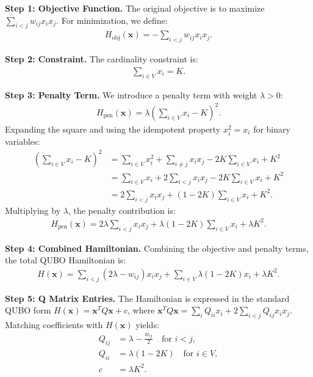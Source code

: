 \documentclass[12pt]{article}
\begin{document}
\textbf{Step 1: Objective Function.}
The original objective is to maximize $\sum_{i < j} w_{ij} x_i x_j$. For minimization, we define:
\begin{align}
    H_{\text{obj}}(\mathbf{x}) = -\sum_{i < j} w_{ij} x_i x_j.
\end{align}

\textbf{Step 2: Constraint.}
The cardinality constraint is:
\begin{align}
    \sum_{i \in V} x_i = K.
\end{align}

\textbf{Step 3: Penalty Term.}
We introduce a penalty term with weight $\lambda > 0$:
\begin{align}
    H_{\text{pen}}(\mathbf{x}) = \lambda \left( \sum_{i \in V} x_i - K \right)^2.
\end{align}
Expanding the square and using the idempotent property $x_i^2 = x_i$ for binary variables:
\begin{align}
    \left( \sum_{i \in V} x_i - K \right)^2 
    &= \sum_{i \in V} x_i^2 + \sum_{i \neq j} x_i x_j - 2K \sum_{i \in V} x_i + K^2 \\
    &= \sum_{i \in V} x_i + 2 \sum_{i < j} x_i x_j - 2K \sum_{i \in V} x_i + K^2 \\
    &= 2 \sum_{i < j} x_i x_j + (1 - 2K) \sum_{i \in V} x_i + K^2.
\end{align}
Multiplying by $\lambda$, the penalty contribution is:
\begin{align}
    H_{\text{pen}}(\mathbf{x}) = 2\lambda \sum_{i < j} x_i x_j + \lambda(1 - 2K) \sum_{i \in V} x_i + \lambda K^2.
\end{align}

\textbf{Step 4: Combined Hamiltonian.}
Combining the objective and penalty terms, the total QUBO Hamiltonian is:
\begin{align}
    H(\mathbf{x}) = \sum_{i < j} (2\lambda - w_{ij}) x_i x_j + \sum_{i \in V} \lambda(1 - 2K) x_i + \lambda K^2.
\end{align}

\textbf{Step 5: Q Matrix Entries.}
The Hamiltonian is expressed in the standard QUBO form $H(\mathbf{x}) = \mathbf{x}^T Q \mathbf{x} + c$, where $\mathbf{x}^T Q \mathbf{x} = \sum_{i} Q_{ii} x_i + 2 \sum_{i < j} Q_{ij} x_i x_j$. Matching coefficients with $H(\mathbf{x})$ yields:
\begin{align}
    Q_{ij} &= \lambda - \frac{w_{ij}}{2} \quad \text{for } i < j, \\
    Q_{ii} &= \lambda(1 - 2K) \quad \text{for } i \in V, \\
    c &= \lambda K^2.
\end{align}
\end{document}
